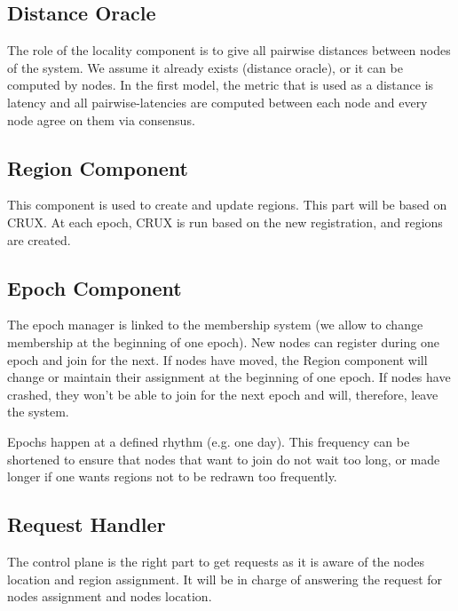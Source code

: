 \documentclass[a4paper,11pt,oneside]{report}
\begin{document}
\subsection{Distance Oracle}

The role of the locality component is to give all pairwise distances between
nodes of the system. We assume it already exists (distance oracle), or it can
be computed by nodes. In the first model, the metric that is used as a distance is latency and all pairwise-latencies are computed
between each node and every node agree on them via consensus. 
 
\subsection{Region Component} This component is used to create and update
regions. This part will be based on CRUX. At each epoch, CRUX is run based on
the new registration, and regions are created.
 
\subsection{Epoch Component} The epoch manager is linked to the membership
system (we allow to change membership at the beginning of one epoch). New nodes
can register during one epoch and join for the next. If nodes have moved, the Region
component will change or maintain their assignment at the beginning of one
epoch. If nodes have crashed, they won't be able to join for the next epoch and
will, therefore, leave the system.

Epochs happen at a defined rhythm (e.g. one day). This frequency can be
shortened to ensure that nodes that want to join do not wait too long, or made
longer if one wants regions not to be redrawn too frequently. 

\subsection{Request Handler} The control plane is the right part to get
requests as it is aware of the nodes location and region assignment. It will be
in charge of answering the request for nodes assignment and nodes location. 
\end{document}
